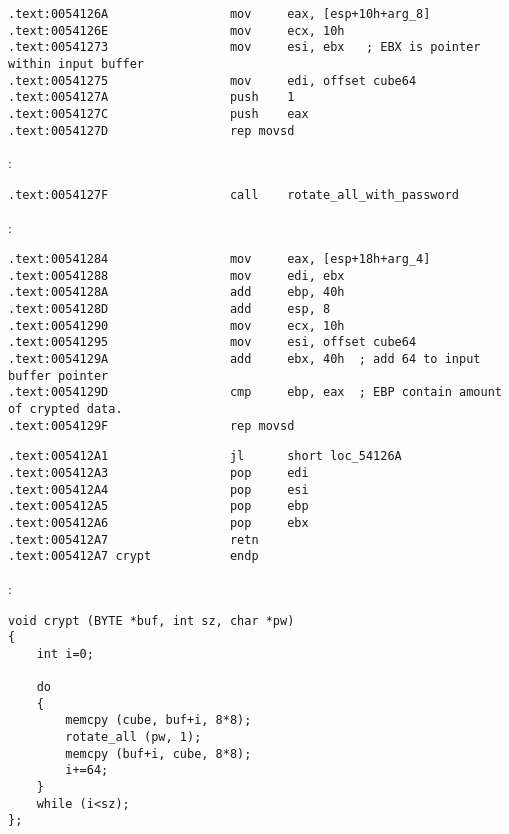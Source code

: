 \begin{lstlisting}
.text:0054126A                 mov     eax, [esp+10h+arg_8]
.text:0054126E                 mov     ecx, 10h
.text:00541273                 mov     esi, ebx   ; EBX is pointer within input buffer
.text:00541275                 mov     edi, offset cube64
.text:0054127A                 push    1
.text:0054127C                 push    eax
.text:0054127D                 rep movsd
\end{lstlisting}

 :

\begin{lstlisting}
.text:0054127F                 call    rotate_all_with_password
\end{lstlisting}

:

\begin{lstlisting}
.text:00541284                 mov     eax, [esp+18h+arg_4]
.text:00541288                 mov     edi, ebx
.text:0054128A                 add     ebp, 40h
.text:0054128D                 add     esp, 8
.text:00541290                 mov     ecx, 10h
.text:00541295                 mov     esi, offset cube64
.text:0054129A                 add     ebx, 40h  ; add 64 to input buffer pointer
.text:0054129D                 cmp     ebp, eax  ; EBP contain amount of crypted data.
.text:0054129F                 rep movsd
\end{lstlisting}


\begin{lstlisting}
.text:005412A1                 jl      short loc_54126A
.text:005412A3                 pop     edi
.text:005412A4                 pop     esi
.text:005412A5                 pop     ebp
.text:005412A6                 pop     ebx
.text:005412A7                 retn
.text:005412A7 crypt           endp
\end{lstlisting}

:

\begin{lstlisting}
void crypt (BYTE *buf, int sz, char *pw)
{
	int i=0;
	
	do
	{
		memcpy (cube, buf+i, 8*8);
		rotate_all (pw, 1);
		memcpy (buf+i, cube, 8*8);
		i+=64;
	}
	while (i<sz);
};
\end{lstlisting}

